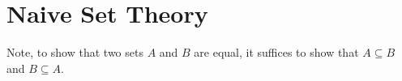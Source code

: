 \guard
\section{Naive Set Theory}
\label{sec:naiveSetTheory}








Note, to show that two sets $A$ and $B$ are equal, it suffices to show that $A\subseteq B$ and $B\subseteq A$.







